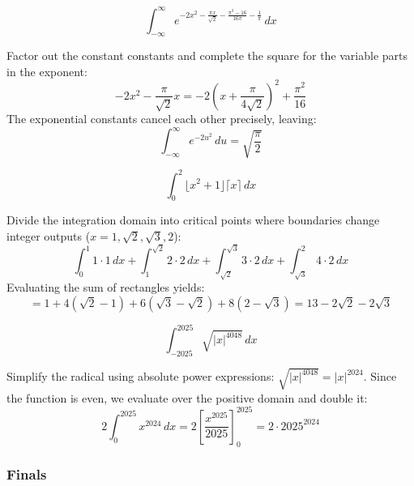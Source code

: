 \begin{questions}
\question
\[ \int_{-\infty}^{\infty} e^{-2x^{2}-\frac{\pi x}{\sqrt{2}}-\frac{\pi^{3}-16}{16\pi}-\frac{1}{\pi}} \, dx \]
\begin{solution}
Factor out the constant constants and complete the square for the variable parts in the exponent:
\[ -2x^2 - \frac{\pi}{\sqrt{2}}x = -2\left(x + \frac{\pi}{4\sqrt{2}}\right)^2 + \frac{\pi^2}{16} \]
The exponential constants cancel each other precisely, leaving:
\[ \int_{-\infty}^{\infty} e^{-2u^2} \, du = \sqrt{\frac{\pi}{2}} \]
\end{solution}

\question
\[ \int_{0}^{2} \lfloor x^{2}+1\rfloor\lceil x\rceil \, dx \]
\begin{solution}
Divide the integration domain into critical points where boundaries change integer outputs ($x = 1, \sqrt{2}, \sqrt{3}, 2$):
\[ \int_{0}^{1} 1 \cdot 1 \, dx + \int_{1}^{\sqrt{2}} 2 \cdot 2 \, dx + \int_{\sqrt{2}}^{\sqrt{3}} 3 \cdot 2 \, dx + \int_{\sqrt{3}}^{2} 4 \cdot 2 \, dx \]
Evaluating the sum of rectangles yields:
\[ = 1 + 4(\sqrt{2}-1) + 6(\sqrt{3}-\sqrt{2}) + 8(2-\sqrt{3}) = 13 - 2\sqrt{2} - 2\sqrt{3} \]
\end{solution}

\question
\[ \int_{-2025}^{2025} \sqrt{|x|^{4048}} \, dx \]
\begin{solution}
Simplify the radical using absolute power expressions: $\sqrt{|x|^{4048}} = |x|^{2024}$. Since the function is even, we evaluate over the positive domain and double it:
\[ 2\int_{0}^{2025} x^{2024} \, dx = 2 \left[ \frac{x^{2025}}{2025} \right]_{0}^{2025} = 2 \cdot 2025^{2024} \]
\end{solution}

\end{questions}

\newpage
\subsubsection*{Finals}

